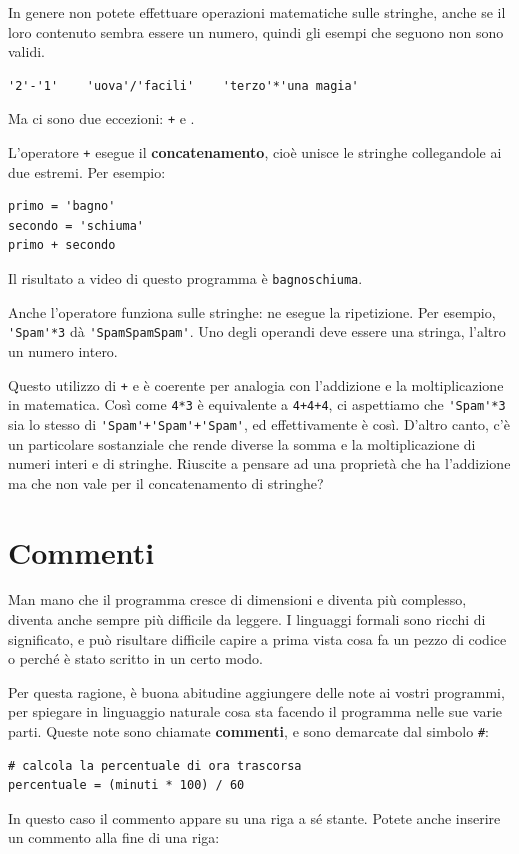 \documentclass[10pt]{book}
\begin{document}
In genere non potete effettuare operazioni matematiche sulle stringhe, anche se il loro contenuto sembra essere un numero, quindi gli esempi che seguono non sono validi.

\begin{verbatim}
'2'-'1'    'uova'/'facili'    'terzo'*'una magia'
\end{verbatim}
%
Ma ci sono due eccezioni: {\tt +} e {\tt *}.

L'operatore {\tt +} esegue il {\bf concatenamento}, cioè unisce le stringhe collegandole ai due estremi. Per esempio:

\begin{verbatim}
primo = 'bagno'
secondo = 'schiuma'
primo + secondo
\end{verbatim}
%
Il risultato a video di questo programma è {\tt bagnoschiuma}.

Anche l'operatore {\tt *} funziona sulle stringhe: ne esegue la ripetizione. Per esempio, \verb"'Spam'*3" dà \verb"'SpamSpamSpam'". Uno degli operandi deve essere una stringa, l'altro un numero intero.

Questo utilizzo di {\tt +} e {\tt *} è coerente per analogia con l'addizione e la moltiplicazione in matematica. Così come {\tt 4*3} è equivalente a {\tt 4+4+4}, ci aspettiamo che \verb"'Spam'*3" sia lo stesso di
\verb"'Spam'+'Spam'+'Spam'", ed effettivamente è così. D'altro canto, c'è un particolare sostanziale che rende diverse la somma e la moltiplicazione di numeri interi e di stringhe. Riuscite a pensare ad una proprietà che ha l'addizione ma che non vale per il concatenamento di stringhe?


\section{Commenti}

Man mano che il programma cresce di dimensioni e diventa più complesso, diventa anche sempre più difficile da leggere. I linguaggi formali sono ricchi di significato, e può risultare difficile capire a prima vista cosa fa un pezzo di codice o perché è stato scritto in un certo modo.

Per questa ragione, è buona abitudine aggiungere delle note ai vostri   programmi, per spiegare in linguaggio naturale cosa sta facendo il programma nelle sue varie parti. Queste note sono chiamate {\bf commenti}, e sono demarcate dal simbolo \verb"#":

\begin{verbatim}
# calcola la percentuale di ora trascorsa
percentuale = (minuti * 100) / 60
\end{verbatim}
%
In questo caso il commento appare su una riga a sé stante. Potete anche inserire un commento alla fine di una riga:
\end{document}
